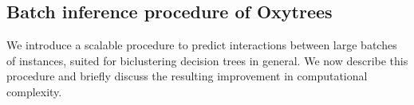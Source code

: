 \documentclass[sn-mathphys-num]{sn-jnl}%
\theoremstyle{thmstyleone}%
\theoremstyle{thmstyletwo}%
\theoremstyle{thmstylethree}%
\begin{document}

\subsection{Batch inference procedure of Oxytrees}
\label{sec:batch inference}

We introduce a scalable procedure to predict interactions between large batches of instances, suited for biclustering decision trees in general. We now describe this procedure and briefly discuss the resulting improvement in computational complexity.
\end{document}
